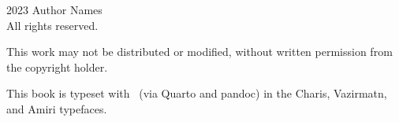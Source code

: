 \thispagestyle{empty}
\begingroup
\footnotesize
\parindent 0pt
\parskip \baselineskip
\textcopyright{} 2023 Author Names \\
All rights reserved.

    This work may not be distributed or modified, without written permission from the copyright holder.


This book is typeset with \XeLaTeX\ (via Quarto and pandoc)
in the Charis, Vazirmatn, and Amiri typefaces.


\vfill




\endgroup
\clearpage

\newpage
\pagestyle{mymainstyle}

